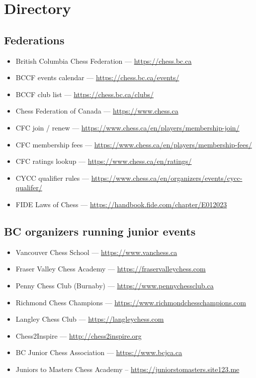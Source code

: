 \documentclass[10pt,letterpaper]{article}
\begin{document}
\section{Directory}
\label{sec:directory}

\subsection*{Federations}
\begin{itemize}
  \item British Columbia Chess Federation --- \url{https://chess.bc.ca}
  \item BCCF events calendar --- \url{https://chess.bc.ca/events/}
  \item BCCF club list --- \url{https://chess.bc.ca/clubs/}
  \item Chess Federation of Canada --- \url{https://www.chess.ca}
  \item CFC join / renew --- \url{https://www.chess.ca/en/players/membership-join/}
  \item CFC membership fees --- \url{https://www.chess.ca/en/players/membership-fees/}
  \item CFC ratings lookup --- \url{https://www.chess.ca/en/ratings/}
  \item CYCC qualifier rules --- \url{https://www.chess.ca/en/organizers/events/cycc-qualifer/}
  \item FIDE Laws of Chess --- \url{https://handbook.fide.com/chapter/E012023}
\end{itemize}

\subsection*{BC organizers running junior events}
\begin{itemize}
  \item Vancouver Chess School --- \url{https://www.vanchess.ca}
  \item Fraser Valley Chess Academy --- \url{https://fraservalleychess.com}
  \item Penny Chess Club (Burnaby) --- \url{https://www.pennychessclub.ca}
  \item Richmond Chess Champions --- \url{https://www.richmondchesschampions.com}
  \item Langley Chess Club --- \url{https://langleychess.com}
  \item Chess2Inspire --- \url{http://chess2inspire.org}
  \item BC Junior Chess Association --- \url{https://www.bcjca.ca}
  \item Juniors to Masters Chess Academy – \url{https://juniorstomasters.site123.me}
\end{itemize}
\end{document}
